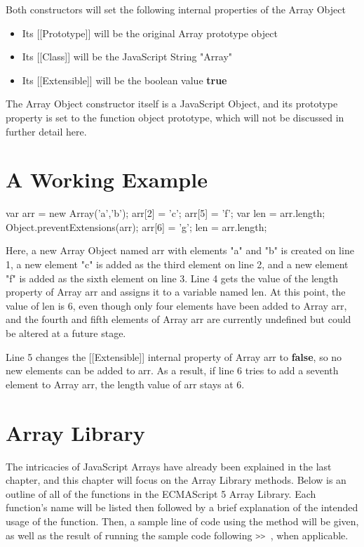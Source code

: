 \documentclass[a4paper,11pt,twoside]{report}
\def\jsinline{\lstinline[language=JavaScript, basicstyle=\small]}%\end{lstlisting}
\begin{document}
Both constructors will set the following internal properties of the Array Object
\begin{itemize}
\item Its [[Prototype]] will be the original Array prototype object
\item Its [[Class]] will be the JavaScript String "Array"
\item Its [[Extensible]] will be the boolean value \textbf{true}
\end{itemize}

The Array Object constructor itself is a JavaScript Object, and its prototype property is set to the function object prototype, which will not be discussed in further detail here.

\section*{A Working Example}
\begin{adjustwidth}{4cm}{4cm}
\begin{lstjs}
var arr = new Array('a','b');
arr[2] = 'c';
arr[5] = 'f';
var len = arr.length;
Object.preventExtensions(arr);
arr[6] = 'g';
len = arr.length;
\end{lstjs}
\end{adjustwidth}

Here, a new Array Object named arr with elements "a" and "b" is created on line 1, a new element "c" is added as the third element on line 2, and a new element "f" is added as the sixth element on line 3. Line 4 gets the value of the length property of Array arr and assigns it to a variable named len. At this point, the value of len is 6, even though only four elements have been added to Array arr, and the fourth and fifth elements of Array arr are currently undefined but could be altered at a future stage.

Line 5 changes the [[Extensible]] internal property of Array arr to \textbf{false}, so no new elements can be added to arr. As a result, if line 6 tries to add a seventh element to Array arr, the length value of arr stays at 6.

\section{Array Library}
The intricacies of JavaScript Arrays have already been explained in the last chapter, and this chapter will focus on the Array Library methods. Below is an outline of all of the functions in the ECMAScript 5 Array Library. Each function's name will be listed then followed by a brief explanation of the intended usage of the function. Then, a sample line of code using the method will be given, as well as the result of running the sample code following \jsinline|>> |, when applicable.
\end{document}
